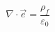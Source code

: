 \begin{equation}
\nabla \cdot \vec{e} = \frac{\rho_f}{\varepsilon_0}
\label{eq:charge_density}
\end{equation}
